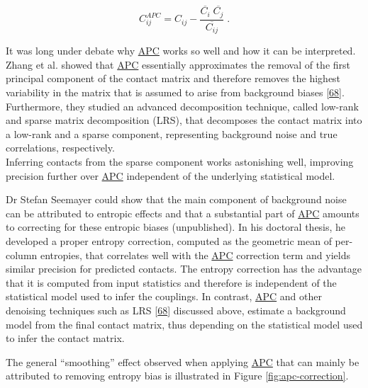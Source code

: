 \documentclass[12pt,a4paper,twoside]{book}
\theoremstyle{definition}
\theoremstyle{definition}
\theoremstyle{remark}
\begin{document}
\begin{equation}
    C_{ij}^{APC}  = C_{ij} - \frac{\overline{C_i} \; \overline{C_j}}{\overline{C_{ij}}}\; .
\label{eq:apc}
\end{equation}

It was long under debate why \protect\hyperlink{abbrev}{APC} works so
well and how it can be interpreted. Zhang et al. showed that
\protect\hyperlink{abbrev}{APC} essentially approximates the removal of
the first principal component of the contact matrix and therefore
removes the highest variability in the matrix that is assumed to arise
from background biases {[}\protect\hyperlink{ref-Zhang2016}{68}{]}.
Furthermore, they studied an advanced decomposition technique, called
low-rank and sparse matrix decomposition (LRS), that decomposes the
contact matrix into a low-rank and a sparse component, representing
background noise and true correlations, respectively.\\
Inferring contacts from the sparse component works astonishing well,
improving precision further over \protect\hyperlink{abbrev}{APC}
independent of the underlying statistical model.

Dr Stefan Seemayer could show that the main component of background
noise can be attributed to entropic effects and that a substantial part
of \protect\hyperlink{abbrev}{APC} amounts to correcting for these
entropic biases (unpublished). In his doctoral thesis, he developed a
proper entropy correction, computed as the geometric mean of per-column
entropies, that correlates well with the \protect\hyperlink{abbrev}{APC}
correction term and yields similar precision for predicted contacts. The
entropy correction has the advantage that it is computed from input
statistics and therefore is independent of the statistical model used to
infer the couplings. In contrast, \protect\hyperlink{abbrev}{APC} and
other denoising techniques such as LRS
{[}\protect\hyperlink{ref-Zhang2016}{68}{]} discussed above, estimate a
background model from the final contact matrix, thus depending on the
statistical model used to infer the contact matrix.

The general ``smoothing'' effect observed when applying
\protect\hyperlink{abbrev}{APC} that can mainly be attributed to
removing entropy bias is illustrated in Figure \ref{fig:apc-correction}.
\end{document}
